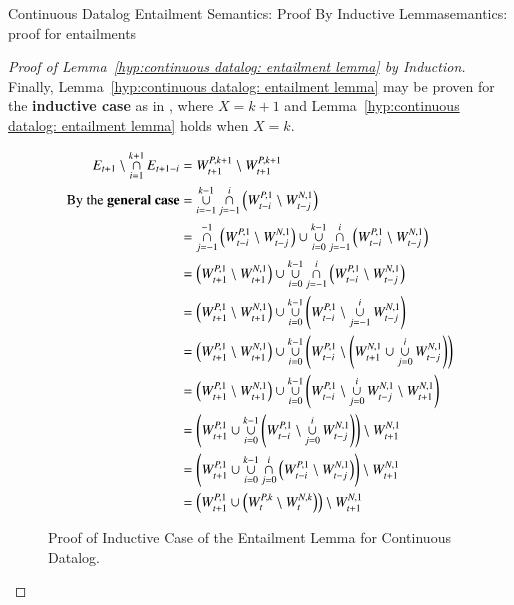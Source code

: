 \begin{nestedsection}{Continuous Datalog Entailment Semantics: Proof By Inductive Lemma}{semantics: proof for entailments}
\begin{proof}[Proof of Lemma~\ref{hyp:continuous datalog: entailment lemma} by Induction]
		Finally, Lemma~\ref{hyp:continuous datalog: entailment lemma} may be proven for the \textbf{inductive case} as in , where ${X = k + 1}$ and Lemma~\ref{hyp:continuous datalog: entailment lemma} holds when ${X = k}$.
		\begin{figure}[p]
			\centering
			\caption[Proof of Entailment Lemma for Continuous Datalog]{Proof of Inductive Case of the Entailment Lemma for Continuous Datalog.}
			\begin{align*}
				E_{t+1} \setminus \mathop{\cap}^{k+1}_{i=1} E_{t+1-i} & = W^{P,k+1}_{t+1} \setminus W^{P,k+1}_{t+1} \\
				\text{By the \textbf{general case}} & = \mathop{\cup}^{k-1}_{i=-1}\mathop{\cap}^{i}_{j=-1} \left( W^{P,1}_{t-i} \setminus W^{N,1}_{t-j} \right) \\
				& = \mathop{\cap}^{-1}_{j=-1} \left( W^{P,1}_{t-i} \setminus W^{N,1}_{t-j} \right) \cup \mathop{\cup}^{k-1}_{i=0}\mathop{\cap}^{i}_{j=-1} \left( W^{P,1}_{t-i} \setminus W^{N,1}_{t-j} \right) \\
				& = \left( W^{P,1}_{t+1} \setminus W^{N,1}_{t+1} \right) \cup \mathop{\cup}^{k-1}_{i=0}\mathop{\cap}^{i}_{j=-1} \left( W^{P,1}_{t-i} \setminus W^{N,1}_{t-j} \right) \\
				& = \left( W^{P,1}_{t+1} \setminus W^{N,1}_{t+1} \right) \cup \mathop{\cup}^{k-1}_{i=0} \left( W^{P,1}_{t-i} \setminus \mathop{\cup}^{i}_{j=-1} W^{N,1}_{t-j} \right) \\
				& = \left( W^{P,1}_{t+1} \setminus W^{N,1}_{t+1} \right) \cup \mathop{\cup}^{k-1}_{i=0} \left( W^{P,1}_{t-i} \setminus \left( W^{N,1}_{t+1} \cup \mathop{\cup}^{i}_{j=0} W^{N,1}_{t-j} \right) \right) \\
				& = \left( W^{P,1}_{t+1} \setminus W^{N,1}_{t+1} \right) \cup \mathop{\cup}^{k-1}_{i=0} \left( W^{P,1}_{t-i} \setminus \mathop{\cup}^{i}_{j=0} W^{N,1}_{t-j} \setminus W^{N,1}_{t+1} \right) \\
				& = \left( W^{P,1}_{t+1} \cup \mathop{\cup}^{k-1}_{i=0} \left( W^{P,1}_{t-i} \setminus \mathop{\cup}^{i}_{j=0} W^{N,1}_{t-j} \right) \right) \setminus W^{N,1}_{t+1} \\
				& = \left( W^{P,1}_{t+1} \cup \mathop{\cup}^{k-1}_{i=0}\mathop{\cap}^{i}_{j=0} \left( W^{P,1}_{t-i} \setminus W^{N,1}_{t-j} \right) \right) \setminus W^{N,1}_{t+1} \\
				& = \left( W^{P,1}_{t+1} \cup \left( W^{P,k}_{t} \setminus W^{N,k}_{t} \right) \right) \setminus W^{N,1}_{t+1} \\

\end{align*}
\end{figure}
\end{proof}
\end{nestedsection}
